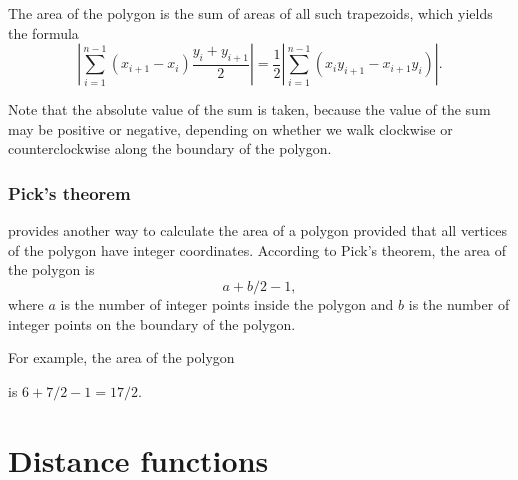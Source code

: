 The area of the polygon is the sum of areas of
all such trapezoids, which yields the formula
\[|\sum_{i=1}^{n-1} (x_{i+1}-x_{i}) \frac{y_i+y_{i+1}}{2}| =
\frac{1}{2} |\sum_{i=1}^{n-1} (x_i y_{i+1} - x_{i+1} y_i)|.\]

Note that the absolute value of the sum is taken,
because the value of the sum may be positive or negative,
depending on whether we walk clockwise or counterclockwise
along the boundary of the polygon.

\subsubsection{Pick's theorem}


 provides another way to calculate
the area of a polygon provided that all vertices 
of the polygon have integer coordinates.
According to Pick's theorem, the area of the polygon is
\[ a + b/2 -1,\]
where $a$ is the number of integer points inside the polygon
and $b$ is the number of integer points on the boundary of the polygon.

For example, the area of the polygon
\begin{center}
\end{center}
is $6+7/2-1=17/2$.

\section{Distance functions}

